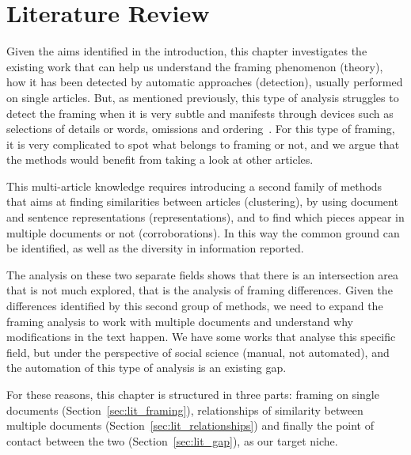 \chapter{Literature Review}
\label{chap:literature_review}



Given the aims identified in the introduction, this chapter investigates the existing work that can help us understand the framing phenomenon (theory), how it has been detected by automatic approaches (detection), usually performed on single articles.
But, as mentioned previously, this type of analysis struggles to detect the framing when it is very subtle and manifests through devices such as selections of details or words, omissions and ordering~\cite{morstatter2018identifying}. For this type of framing, it is very complicated to spot what belongs to framing or not, and we argue that the methods would benefit from taking a look at other articles.

This multi-article knowledge requires introducing a second family of methods that aims at finding similarities between articles (clustering), by using document and sentence representations (representations), and to find which pieces appear in multiple documents or not (corroborations). In this way the common ground can be identified, as well as the diversity in information reported.

The analysis on these two separate fields shows that there is an intersection area that is not much explored, that is the analysis of framing differences. Given the differences identified by this second group of methods, we need to expand the framing analysis to work with multiple documents and understand why modifications in the text happen.
We have some works that analyse this specific field, but under the perspective of social science (manual, not automated), and the automation of this type of analysis is an existing gap.


For these reasons, this chapter is structured in three parts: framing on single documents (Section~\ref{sec:lit_framing}), relationships of similarity between multiple documents (Section~\ref{sec:lit_relationships}) and finally the point of contact between the two (Section~\ref{sec:lit_gap}), as our target niche.

